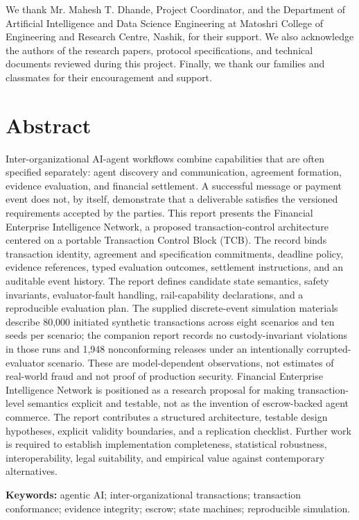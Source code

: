 \documentclass[12pt,a4paper,oneside]{report}
\newcommand{\TCB}{TCB}
\renewcommand{\headrulewidth}{0.4pt}\renewcommand{\footrulewidth}{0.4pt}
\begin{document}
We thank Mr. Mahesh T. Dhande, Project Coordinator, and the Department of Artificial Intelligence and Data Science Engineering at Matoshri College of Engineering and Research Centre, Nashik, for their support. We also acknowledge the authors of the research papers, protocol specifications, and technical documents reviewed during this project. Finally, we thank our families and classmates for their encouragement and support.
\clearpage

\chapter*{Abstract}
Inter-organizational AI-agent workflows combine capabilities that are often specified separately: agent discovery and communication, agreement formation, evidence evaluation, and financial settlement. A successful message or payment event does not, by itself, demonstrate that a deliverable satisfies the versioned requirements accepted by the parties. This report presents the Financial Enterprise Intelligence Network, a proposed transaction-control architecture centered on a portable Transaction Control Block (\TCB). The record binds transaction identity, agreement and specification commitments, deadline policy, evidence references, typed evaluation outcomes, settlement instructions, and an auditable event history. The report defines candidate state semantics, safety invariants, evaluator-fault handling, rail-capability declarations, and a reproducible evaluation plan. The supplied discrete-event simulation materials describe 80,000 initiated synthetic transactions across eight scenarios and ten seeds per scenario; the companion report records no custody-invariant violations in those runs and 1,948 nonconforming releases under an intentionally corrupted-evaluator scenario. These are model-dependent observations, not estimates of real-world fraud and not proof of production security. Financial Enterprise Intelligence Network is positioned as a research proposal for making transaction-level semantics explicit and testable, not as the invention of escrow-backed agent commerce. The report contributes a structured architecture, testable design hypotheses, explicit validity boundaries, and a replication checklist. Further work is required to establish implementation completeness, statistical robustness, interoperability, legal suitability, and empirical value against contemporary alternatives.

\noindent\textbf{Keywords:} agentic AI; inter-organizational transactions; transaction conformance; evidence integrity; escrow; state machines; reproducible simulation.
\clearpage
\tableofcontents
\clearpage
\listoffigures
\clearpage
\listoftables
\clearpage
\pagestyle{fancy}
\fancyhf{}
\fancyfoot[R]{\small\bfseries\thepage}
\renewcommand{\headrulewidth}{0.4pt}\renewcommand{\footrulewidth}{0.4pt}
\end{document}
